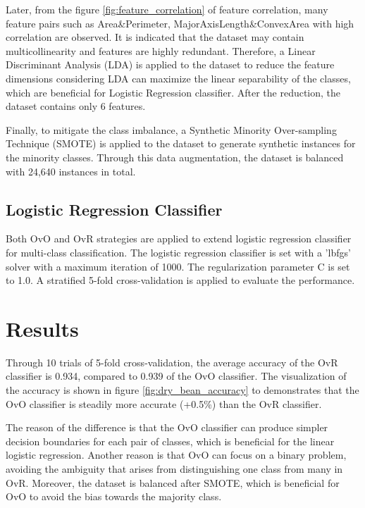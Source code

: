 \documentclass[12pt,a4paper]{article}
\begin{document}
Later, from the figure \ref{fig:feature_correlation} of feature correlation, many feature pairs such as Area&Perimeter, MajorAxisLength&ConvexArea with high correlation are observed. It is indicated that the dataset may contain multicollinearity and features are highly redundant. 
Therefore, a Linear Discriminant Analysis (LDA) is applied to the dataset to reduce the feature dimensions considering LDA can maximize the linear separability of the classes, which are beneficial for Logistic Regression classifier. After the reduction, the dataset contains only 6 features.

Finally, to mitigate the class imbalance, a Synthetic Minority Over-sampling Technique (SMOTE) \cite{chawla2002smote} is applied to the dataset to generate synthetic instances for the minority classes. 
Through this data augmentation, the dataset is balanced with 24,640 instances in total.
\subsection{Logistic Regression Classifier}\label{subsec:classifier}
Both OvO \cite{scikit-learn_OneVsRestClassifier} and OvR \cite{scikit-learn_OneVsOneClassifier} strategies are applied to extend logistic regression classifier for multi-class classification. 
The logistic regression classifier is set with a 'lbfgs' solver with a maximum iteration of 1000. The regularization parameter C is set to 1.0. 
A stratified 5-fold cross-validation \cite{scikit-learn_cross_validation} is applied to evaluate the performance.

\section{Results}\label{sec:results}
Through 10 trials of 5-fold cross-validation, the average accuracy of the OvR classifier is 0.934, compared to 0.939 of the OvO classifier. 
The visualization of the accuracy is shown in figure \ref{fig:dry_bean_accuracy} to demonstrates that the OvO classifier is steadily more accurate (+0.5\%) than the OvR classifier.

The reason of the difference is that the OvO\textit{} classifier can produce simpler decision boundaries for each pair of classes, which is beneficial for the linear logistic regression. 
Another reason is that OvO can focus on a binary problem, avoiding the ambiguity that arises from distinguishing one class from many in OvR. 
Moreover, the dataset is balanced after SMOTE, which is beneficial for OvO to avoid the bias towards the majority class.
\end{document}
